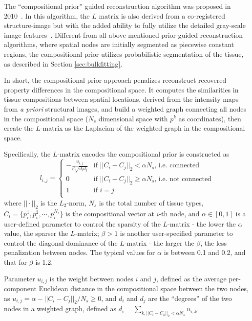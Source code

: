 \documentclass[12pt]{book}               %
\begin{document}
The ``compositional prior'' guided reconstruction algorithm was proposed in 2010~\cite{Fang2010}. In this algorithm, the $L$ matrix is also derived from a co-registered structure-image but with the added ability to fully utilize the detailed gray-scale image features~\cite{Deng2015a}. Different from all above mentioned prior-guided reconstruction algorithms, where spatial nodes are initially segmented as piecewise constant regions, the compositional prior utilizes probabilistic segmentation of the tissue, as described in Section \ref{sec:bulkfitting}. 

In short, the compositional prior approach penalizes reconstruct recovered property differences in the compositional space. It
computes the similarities in tissue compositions between spatial locations, derived from the intensity maps from \emph{a priori} structural images, and build a weighted graph connecting all nodes in the compositional space ($N_s$ dimensional space with $p^k$ as coordinates), then create the $L$-matrix as the Laplacian of the weighted graph in the compositional space.

Specifically, the $L$-matrix encodes the compositional prior is constructed as
\begin{equation}
l_{i,j}=\left\{\begin{array}{cl}
-\frac{u_{i,j}}{\beta\sqrt{d_id_j}}& \textrm{if $||C_i-C_j||_2<\alpha N_s$, i.e. connected}\\
0 &\textrm{if $||C_i-C_j||_2\ge\alpha N_s$, i.e. not connected}\\
1 & \textrm{if $i=j$}\\
\end{array}\right.
\end{equation}
where $||\cdot||_2$ is the $L_2$-norm, $N_s$ is the total number of tissue types, $C_i=\{p^1_i,p^2_i,\cdots,p^{N_s}_i\}$ is the compositional vector at $i$-th node, and $\alpha\in[0, 1]$ is a user-defined parameter to control the sparsity of the $L$-matrix - the lower the $\alpha$ value, the sparser the $L$-matrix; $\beta>1$ is another user-specified parameter to control the diagonal dominance of the $L$-matrix - the larger the $\beta$, the less penalization between nodes. The typical values for $\alpha$ is between 0.1 and 0.2, and that for $\beta$ is 1.2. 

Parameter $u_{i,j}$ is the weight between nodes $i$ and $j$, defined as the average per-component Euclidean distance in the compositional space between the two nodes, as $u_{i,j}=\alpha-||C_i-C_j||_2/N_s\ge 0$, and $d_i$ and $d_j$ are the ``degrees'' of the two nodes in a weighted graph, defined as $d_i=\sum_{k,||C_i-C_k||_2<\alpha N_s}{u_{i,k}}$.
\end{document}

